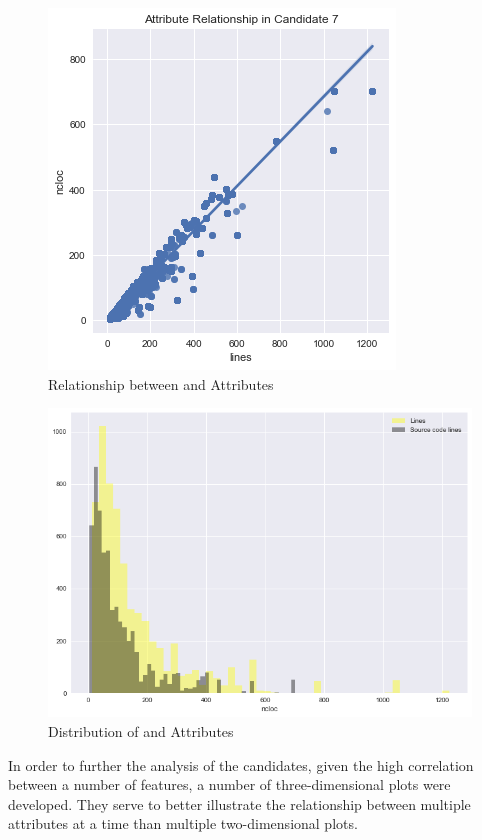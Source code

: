 \begin{enumerate}
\begin{figure}
    \centering
    \includegraphics[scale=0.7]{Figures/correlation/Attribute_Relationship_in_Candidate_7.png}
    \caption{Relationship between \ncloc{} and \lines{} Attributes}
    \label{fig:candidate7-scatterplot}
\end{figure}

\begin{figure}
    \centering
    \includegraphics[scale=0.6]{Figures/correlation/Attribute_Distribution_in_Candidate_7.png}
    \caption{Distribution of \ncloc{} and \lines{} Attributes}
    \label{fig:candidate7-distribution}
\end{figure}


In order to further the analysis of the candidates, given the high correlation between a number of features, a number of three-dimensional plots were developed. They serve to better illustrate the relationship between multiple attributes at a time than multiple two-dimensional plots.


\end{enumerate}
